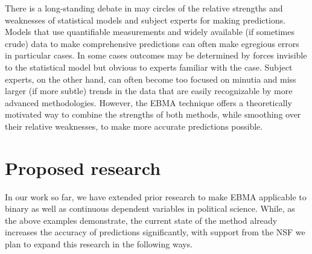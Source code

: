 \documentclass[pdftex,12pt,fullpage,oneside]{amsart}
\begin{document}

There is a long-standing debate in may circles of the relative
strengths and weaknesses of statistical models and subject experts for
making predictions.  Models that use quantifiable measurements and
widely available (if sometimes crude) data to make comprehensive
predictions can often make egregious errors in particular cases.  In
some cases outcomes may be determined by forces invisible to the
statistical model but obvious to experts familiar with the case.
Subject experts, on the other hand, can often become too focused on
minutia and miss larger (if more subtle) trends in the data that are
easily recognizable by more advanced methodologies.  However, the EBMA
technique offers a theoretically motivated way to combine the
strengths of both methods, while smoothing over their relative
weaknesses, to make more accurate predictions possible.

\section{Proposed research}

In our work so far, we have extended prior research to make EBMA
applicable to binary as well as continuous dependent variables in
political science.  While, as the above examples demonstrate, the
current state of the method already increases the accuracy of
predictions significantly, with support from the NSF we plan to expand
this research in the following ways.
\end{document}

